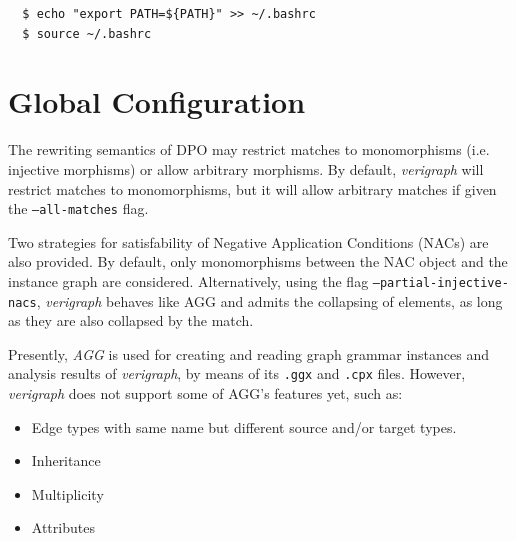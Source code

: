 \documentclass[12pt]{article}
\begin{document}
\begin{verbatim}
  $ echo "export PATH=${PATH}" >> ~/.bashrc
  $ source ~/.bashrc
\end{verbatim}




\section{Global Configuration}

The rewriting semantics of DPO may restrict matches to monomorphisms (i.e. injective morphisms) or allow arbitrary morphisms. By default, \emph{verigraph} will restrict matches to monomorphisms, but it will allow arbitrary matches if given the \texttt{--all-matches} flag.

Two strategies for satisfability of Negative Application Conditions (NACs) are also provided. By default, only monomorphisms between the NAC object and the instance graph are considered. Alternatively, using the flag \texttt{--partial-injective-nacs}, \emph{verigraph} behaves like AGG and admits the collapsing of elements, as long as they are also collapsed by the match.

Presently, \emph{AGG} is used for creating and reading graph grammar instances and analysis results of \emph{verigraph}, by means of its \texttt{.ggx} and \texttt{.cpx} files. However, \emph{verigraph} does not support some of AGG's features yet, such as:

\begin{itemize}
\item Edge types with same name but different source and/or target types.
\item Inheritance
\item Multiplicity
\item Attributes
\end{itemize}
\end{document}
